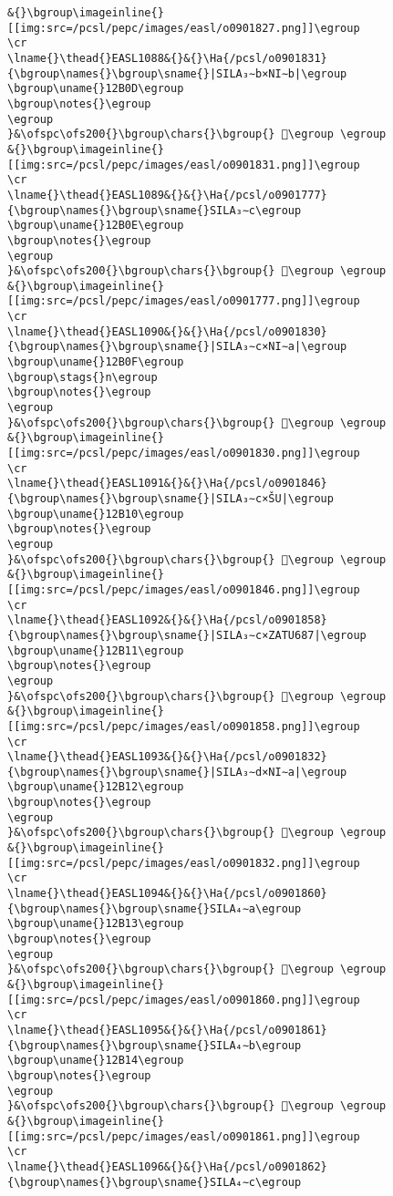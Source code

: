 \begin{verbatim}
&{}\bgroup\imageinline{}[[img:src=/pcsl/pepc/images/easl/o0901827.png]]\egroup
\cr
\lname{}\thead{}EASL1088&{}&{}\Ha{/pcsl/o0901831}{\bgroup\names{}\bgroup\sname{}|SILA₃∼b×NI∼b|\egroup
\bgroup\uname{}12B0D\egroup
\bgroup\notes{}\egroup
\egroup
}&\ofspc\ofs200{}\bgroup\chars{}\bgroup{} 𒬍\egroup \egroup
&{}\bgroup\imageinline{}[[img:src=/pcsl/pepc/images/easl/o0901831.png]]\egroup
\cr
\lname{}\thead{}EASL1089&{}&{}\Ha{/pcsl/o0901777}{\bgroup\names{}\bgroup\sname{}SILA₃∼c\egroup
\bgroup\uname{}12B0E\egroup
\bgroup\notes{}\egroup
\egroup
}&\ofspc\ofs200{}\bgroup\chars{}\bgroup{} 𒬎\egroup \egroup
&{}\bgroup\imageinline{}[[img:src=/pcsl/pepc/images/easl/o0901777.png]]\egroup
\cr
\lname{}\thead{}EASL1090&{}&{}\Ha{/pcsl/o0901830}{\bgroup\names{}\bgroup\sname{}|SILA₃∼c×NI∼a|\egroup
\bgroup\uname{}12B0F\egroup
\bgroup\stags{}n\egroup
\bgroup\notes{}\egroup
\egroup
}&\ofspc\ofs200{}\bgroup\chars{}\bgroup{} 𒬏\egroup \egroup
&{}\bgroup\imageinline{}[[img:src=/pcsl/pepc/images/easl/o0901830.png]]\egroup
\cr
\lname{}\thead{}EASL1091&{}&{}\Ha{/pcsl/o0901846}{\bgroup\names{}\bgroup\sname{}|SILA₃∼c×ŠU|\egroup
\bgroup\uname{}12B10\egroup
\bgroup\notes{}\egroup
\egroup
}&\ofspc\ofs200{}\bgroup\chars{}\bgroup{} 𒬐\egroup \egroup
&{}\bgroup\imageinline{}[[img:src=/pcsl/pepc/images/easl/o0901846.png]]\egroup
\cr
\lname{}\thead{}EASL1092&{}&{}\Ha{/pcsl/o0901858}{\bgroup\names{}\bgroup\sname{}|SILA₃∼c×ZATU687|\egroup
\bgroup\uname{}12B11\egroup
\bgroup\notes{}\egroup
\egroup
}&\ofspc\ofs200{}\bgroup\chars{}\bgroup{} 𒬑\egroup \egroup
&{}\bgroup\imageinline{}[[img:src=/pcsl/pepc/images/easl/o0901858.png]]\egroup
\cr
\lname{}\thead{}EASL1093&{}&{}\Ha{/pcsl/o0901832}{\bgroup\names{}\bgroup\sname{}|SILA₃∼d×NI∼a|\egroup
\bgroup\uname{}12B12\egroup
\bgroup\notes{}\egroup
\egroup
}&\ofspc\ofs200{}\bgroup\chars{}\bgroup{} 𒬒\egroup \egroup
&{}\bgroup\imageinline{}[[img:src=/pcsl/pepc/images/easl/o0901832.png]]\egroup
\cr
\lname{}\thead{}EASL1094&{}&{}\Ha{/pcsl/o0901860}{\bgroup\names{}\bgroup\sname{}SILA₄∼a\egroup
\bgroup\uname{}12B13\egroup
\bgroup\notes{}\egroup
\egroup
}&\ofspc\ofs200{}\bgroup\chars{}\bgroup{} 𒬓\egroup \egroup
&{}\bgroup\imageinline{}[[img:src=/pcsl/pepc/images/easl/o0901860.png]]\egroup
\cr
\lname{}\thead{}EASL1095&{}&{}\Ha{/pcsl/o0901861}{\bgroup\names{}\bgroup\sname{}SILA₄∼b\egroup
\bgroup\uname{}12B14\egroup
\bgroup\notes{}\egroup
\egroup
}&\ofspc\ofs200{}\bgroup\chars{}\bgroup{} 𒬔\egroup \egroup
&{}\bgroup\imageinline{}[[img:src=/pcsl/pepc/images/easl/o0901861.png]]\egroup
\cr
\lname{}\thead{}EASL1096&{}&{}\Ha{/pcsl/o0901862}{\bgroup\names{}\bgroup\sname{}SILA₄∼c\egroup

\end{verbatim}
